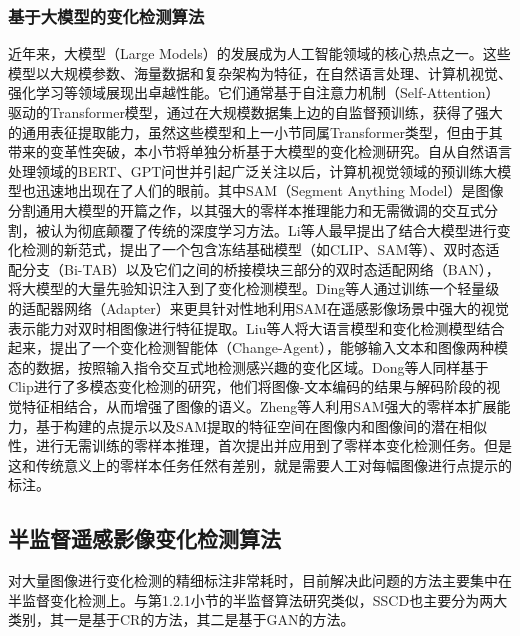 \documentclass[lang=chs, degree=master, blindreview=false, adobe=false]{yanputhesis}
\begin{document}
\subsubsection{基于大模型的变化检测算法}
近年来，大模型（Large Models）的发展成为人工智能领域的核心热点之一。这些模型以大规模参数、海量数据和复杂架构为特征，在自然语言处理、计算机视觉、强化学习等领域展现出卓越性能。它们通常基于自注意力机制（Self-Attention）驱动的Transformer模型，通过在大规模数据集上边的自监督预训练，获得了强大的通用表征提取能力，虽然这些模型和上一小节同属Transformer类型，但由于其带来的变革性突破，本小节将单独分析基于大模型的变化检测研究。自从自然语言处理领域的BERT、GPT问世并引起广泛关注以后，计算机视觉领域的预训练大模型也迅速地出现在了人们的眼前。其中SAM\cite{kirillov2023SAM}（Segment Anything Model）是图像分割通用大模型的开篇之作，以其强大的零样本推理能力和无需微调的交互式分割，被认为彻底颠覆了传统的深度学习方法。Li等人\cite{li2024LM}最早提出了结合大模型进行变化检测的新范式，提出了一个包含冻结基础模型（如CLIP\cite{radford2021clip}、SAM等）、双时态适配分支（Bi-TAB）以及它们之间的桥接模块三部分的双时态适配网络（BAN），将大模型的大量先验知识注入到了变化检测模型。Ding等人\cite{ding2024SAMCD}通过训练一个轻量级的适配器网络（Adapter）来更具针对性地利用SAM在遥感影像场景中强大的视觉表示能力对双时相图像进行特征提取。Liu等人\cite{liu2024changeagent}将大语言模型和变化检测模型结合起来，提出了一个变化检测智能体（Change-Agent），能够输入文本和图像两种模态的数据，按照输入指令交互式地检测感兴趣的变化区域。Dong等人\cite{dong2024changeclip}同样基于Clip进行了多模态变化检测的研究，他们将图像-文本编码的结果与解码阶段的视觉特征相结合，从而增强了图像的语义。Zheng等人\cite{zheng2024SAC}利用SAM强大的零样本扩展能力，基于构建的点提示以及SAM提取的特征空间在图像内和图像间的潜在相似性，进行无需训练的零样本推理，首次提出并应用到了零样本变化检测任务。但是这和传统意义上的零样本任务任然有差别，就是需要人工对每幅图像进行点提示的标注。
\subsection{半监督遥感影像变化检测算法}
对大量图像进行变化检测的精细标注非常耗时，目前解决此问题的方法主要集中在半监督变化检测上。与第1.2.1小节的半监督算法研究类似，SSCD也主要分为两大类别，其一是基于CR的方法，其二是基于GAN的方法。
\end{document}
